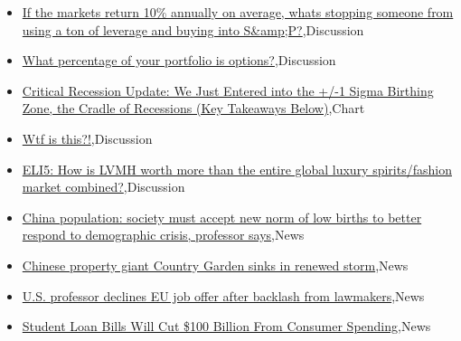 \documentclass{article}%
\begin{document}
%
\begin{itemize}%
\item%
\href{https://reddit.com/r/wallstreetbets/comments/156anh6/if\_the\_markets\_return\_10\_annually\_on\_average/}{If the markets return 10\% annually on average, whats stopping someone from using a ton of leverage and buying into S\&amp;P?},Discussion%
\item%
\href{https://reddit.com/r/wallstreetbets/comments/1565vwe/what\_percentage\_of\_your\_portfolio\_is\_options/}{What percentage of your portfolio is options?},Discussion%
\item%
\href{https://reddit.com/r/wallstreetbets/comments/1563yfz/critical\_recession\_update\_we\_just\_entered\_into/}{Critical Recession Update: We Just Entered into the +/-1 Sigma Birthing Zone, the Cradle of Recessions (Key Takeaways Below)},Chart%
\item%
\href{https://reddit.com/r/StockMarket/comments/156erbh/wtf\_is\_this/}{Wtf is this?!},Discussion%
\item%
\href{https://reddit.com/r/StockMarket/comments/1562re2/eli5\_how\_is\_lvmh\_worth\_more\_than\_the\_entire/}{ELI5: How is LVMH worth more than the entire global luxury spirits/fashion market combined?},Discussion%
\item%
\href{https://reddit.com/r/Economics/comments/1567l98/china\_population\_society\_must\_accept\_new\_norm\_of/}{China population: society must accept new norm of low births to better respond to demographic crisis, professor says},News%
\item%
\href{https://reddit.com/r/Economics/comments/155ssnz/chinese\_property\_giant\_country\_garden\_sinks\_in/}{Chinese property giant Country Garden sinks in renewed storm},News%
\item%
\href{https://reddit.com/r/Economics/comments/155q0aa/us\_professor\_declines\_eu\_job\_offer\_after\_backlash/}{U.S. professor declines EU job offer after backlash from lawmakers},News%
\item%
\href{https://reddit.com/r/Economics/comments/155oqaz/student\_loan\_bills\_will\_cut\_100\_billion\_from/}{Student Loan Bills Will Cut \$100 Billion From Consumer Spending},News%
\end{itemize}%
\end{document}
